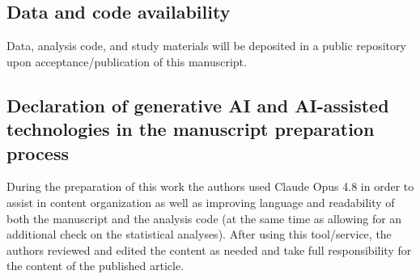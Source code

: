 \documentclass[a4paper, 12pt, fleqn]{article}
\theoremstyle{definition}
\begin{document}
\subsection{Data and code availability}
Data, analysis code, and study materials will be deposited in a public repository upon acceptance/publication of this manuscript. 


\subsection{Declaration of generative AI and AI-assisted technologies in the manuscript preparation process}
During the preparation of this work the authors used Claude Opus 4.8 in order to assist in content organization as well as improving language and readability of both the manuscript and the analysis code (at the same time as allowing for an additional check on the statistical analyses). After using this tool/service, the authors reviewed and edited the content as needed and take full responsibility for the content of the published article.


\newpage
\thispagestyle{plain}
\addtolength{\topmargin}{-.5cm}
\addtolength{\textheight}{.8cm}



\end{document}
